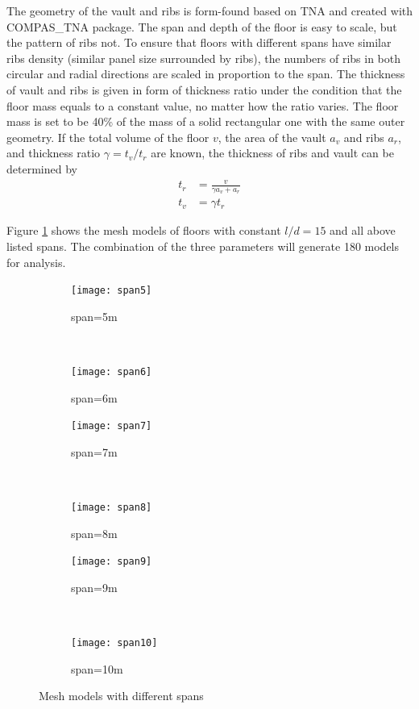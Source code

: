 The geometry of the vault and ribs is form-found based on TNA and created with COMPAS\_TNA package. The span and depth of the floor is easy to scale, but the pattern of ribs not. To ensure that floors with different spans have similar ribs density (similar panel size surrounded by ribs), the numbers of ribs in both circular and radial directions are scaled in proportion to the span. The thickness of vault and ribs is given in form of thickness ratio under the condition that the floor mass equals to a constant value, no matter how the ratio varies. The floor mass is set to be 40\% of the mass of a solid rectangular one with the same outer geometry. If the total volume of the floor $v$, the area of the vault $a_v$ and ribs $a_r$, and thickness ratio $\gamma = t_v/t_r$ are known, the thickness of ribs and vault can be determined by
\begin{align}
    t_r &= \frac{v}{\gamma a_v+a_r}\\
    t_v &= \gamma t_r
\end{align}

Figure \ref{fig:mehs_models} shows the mesh models of floors with constant $l/d=15$ and all above listed spans. The combination of the three parameters will generate 180 models for analysis.

\begin{figure}[H]
\begin{subfigure}[b]{.48\textwidth}
  \centering
  \texttt{[image: span5]}
  \caption{span=5m}
\end{subfigure}
~
\begin{subfigure}[b]{.48\textwidth}
  \centering
  \texttt{[image: span6]}
  \caption{span=6m}
\end{subfigure}

\begin{subfigure}[b]{.48\textwidth}
  \centering
  \texttt{[image: span7]}
  \caption{span=7m}
\end{subfigure}
~
\begin{subfigure}[b]{.48\textwidth}
  \centering
  \texttt{[image: span8]}
  \caption{span=8m}
\end{subfigure}

\begin{subfigure}[b]{.48\textwidth}
  \centering
  \texttt{[image: span9]}
  \caption{span=9m}
\end{subfigure}
~
\begin{subfigure}[b]{.48\textwidth}
  \centering
  \texttt{[image: span10]}
  \caption{span=10m}
\end{subfigure}

\caption{Mesh models with different spans}
\label{fig:mehs_models}
\end{figure}

